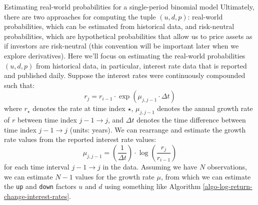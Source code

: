 \documentclass[11pt]{article}
\makeatletter
\theoremstyle{definition}
\renewcommand\subsubsection{\@startsection
	{subsubsection}{2}{0mm}
	{-0.05in}
	{-0.5\baselineskip}
	{\normalfont\normalsize\itshape\bfseries}}
\makeatother
\begin{document}
\subsubsection{Estimating real-world probabilities for a single-period binomial model}
Ultimately, there are two approaches for computing the tuple $(u,d,p)$: real-world probabilities, which can be estimated from historical data, and risk-neutral probabilities, 
which are hypothetical probabilities that allow us to price assets as if investors are risk-neutral (this convention will be important later when we explore derivatives). 
Here we'll focus on estimating the real-world probabilities $(u,d,p)$ from historical data, in particular, interest rate data that is reported and published daily.
Suppose the interest rates were continuously compounded such that:
\begin{equation}
r_{j} = r_{i-1}\cdot\exp\left(\mu_{j,j-1}\cdot\Delta{t}\right)
\end{equation}
where $r_{\star}$ denotes the rate at time index $\star$, $\mu_{j,j-1}$ denotes the annual growth rate of $r$ between time index 
$j-1\rightarrow{j}$, and $\Delta{t}$ denotes the time difference between time index $j - 1\rightarrow{j}$ (units: years). 
We can rearrange and estimate the growth rate values from the reported interest rate values:
\begin{equation}
\mu_{j,j-1} = \left(\frac{1}{\Delta{t}}\right)\cdot\log\left(\frac{r_{j}}{r_{i-1}}\right)
\end{equation}
for each time interval $j - 1\rightarrow{j}$ in the data. Assuming we have $N$ observations, we can estimate $N-1$ values for the 
growth rate $\mu$, from which we can estimate the \texttt{up} and \texttt{down} factors $u$ and $d$ using something like Algorithm \ref{algo-log-return-change-interest-rates}.
\end{document}
